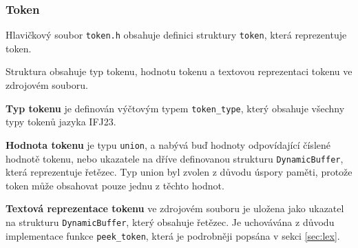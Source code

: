 \documentclass[a4paper, 11pt]{article}
\begin{document}
	\subsubsection{Token}
	Hlavičkový soubor \texttt{token.h} obsahuje definici struktury \texttt{token}, která reprezentuje token.
	\par\noindent Struktura obsahuje typ tokenu, hodnotu tokenu a textovou reprezentaci tokenu ve zdrojovém souboru. 
	\par\noindent \textbf{Typ tokenu} je definován výčtovým typem \texttt{token\_type}, který obsahuje všechny typy tokenů jazyka IFJ23. 
	\par\noindent \textbf{Hodnota tokenu} je typu \texttt{union}, a nabývá buď hodnoty odpovídající číslené hodnotě tokenu, nebo ukazatele na dříve definovanou strukturu \texttt{DynamicBuffer}, která reprezentuje řetězec.
	Typ union byl zvolen z důvodu úspory paměti, protože token může obsahovat pouze jednu z těchto hodnot.
	\par\noindent \textbf{Textová reprezentace tokenu} ve zdrojovém souboru je uložena jako ukazatel na strukturu \texttt{DynamicBuffer}, který obsahuje řetězec.
	Je uchovávána z důvodu implementace funkce \texttt{peek\_token}, která je podrobněji popsána v sekci \ref{sec:lex}.
\end{document}
